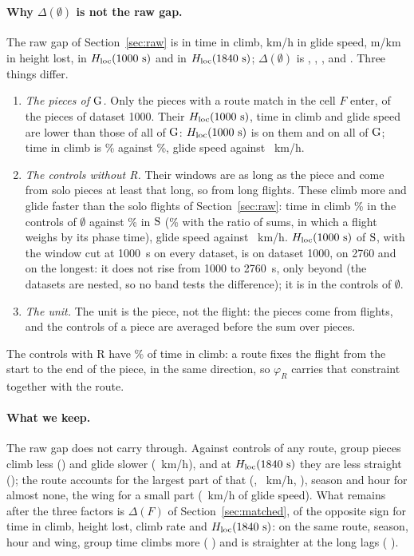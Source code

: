 \paragraph{Why $\Delta(\emptyset)$ is not the raw gap.} The raw gap of Section~\ref{sec:raw} is \RawGapClimb{} in time in climb, \RawGapGlide{} km/h in glide speed, \RawGapSink{} m/km in height lost, \RawGapHK{} in $H_\mathrm{loc}(1000~\mathrm{s})$ and \RawGapHQ{} in $H_\mathrm{loc}(1840~\mathrm{s})$; $\Delta(\emptyset)$ is
\DecNoneClimb, \DecNoneGlide, \DecNoneSink, \DecNoneHK{} and \DecNoneHQ. Three things differ.
\begin{enumerate}[label=(\alph*)]
  \item \emph{The pieces of $\mathrm{G}$.} Only the pieces with a route match in the cell $F$ enter, \DecPiecesK{} of the \RawPiecesOneG{} pieces of dataset 1000. Their $H_\mathrm{loc}(1000~\mathrm{s})$, time in climb and glide speed are lower than those of all of $\mathrm{G}$: $H_\mathrm{loc}(1000~\mathrm{s})$ is \DecGroupHK{} on them and
  \RawHKOneG{} on all of $\mathrm{G}$; time in climb is \DecGroupClimb\% against \RawStatClimbG\%, glide speed \DecGroupGlide{} against \RawStatGlideG~km/h.
  \item \emph{The controls without R.} Their windows are as long as the piece and come from solo pieces at least that long, so from long flights. These climb more and glide faster than the solo flights of Section~\ref{sec:raw}:
  time in climb \DecCtlClimbNone\% in the controls of $\emptyset$ against \RawStatClimbS\% in $\mathrm{S}$ (\RawSumClimbS\% with the ratio of sums, in which a flight weighs by its phase time), glide speed \DecCtlGlideNone{} against \RawStatGlideS~km/h. $H_\mathrm{loc}(1000~\mathrm{s})$ of $\mathrm{S}$, with the window cut at 1000~s on every dataset, is \RawHKOneS{} on dataset 1000, \RawHKCutTwoS{} on 2760 and \RawHKCutLongS{} on the longest: it does not rise from 1000 to 2760~s, only beyond (the datasets are nested, so no band tests the difference); it is \DecCtlHKNone{} in the controls of $\emptyset$.
  \item \emph{The unit.} The unit is the piece, not the flight: the \DecPiecesK{} pieces come from \MatNGFlightsGSide{} flights, and the controls of a piece are averaged before the sum over pieces.
\end{enumerate}
The controls with R have \DecCtlClimbR\% of time in climb: a route fixes the flight from the start to the end of the piece, in the same direction, so $\varphi_R$ carries that constraint together with the route.

\paragraph{What we keep.} The raw gap does not carry through. Against controls of any route, group pieces climb less (\DecNoneClimb) and glide slower (\DecNoneGlide~km/h), and at $H_\mathrm{loc}(1840~\mathrm{s})$ they are less straight (\DecNoneHQ);
the route accounts for the largest part of that (\DecPhiClimbR, \DecPhiGlideR~km/h, \DecPhiHQR), season and hour for almost none, the wing for a small part (\DecPhiGlideW~km/h of glide speed).
What remains after the three factors is $\Delta(F)$ of Section~\ref{sec:matched}, of the opposite sign for time in climb, height lost, climb rate and $H_\mathrm{loc}(1840~\mathrm{s})$: on the same route, season, hour and wing, group time climbs more (\DecDeltaClimbF{} \DecDeltaClimbFBand) and is straighter at the long lags (\DecDeltaHQF{} \DecDeltaHQFBand).
